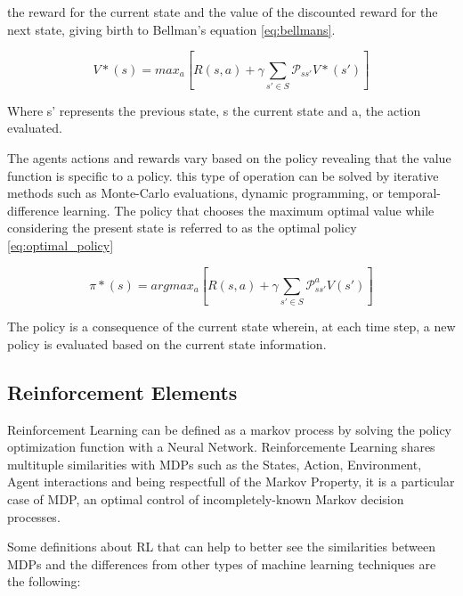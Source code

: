 the reward for the current state and the value of the discounted reward for the next state, giving birth to Bellman's equation \ref{eq:bellmans}.

\begin{equation}
    \label{eq:bellmans}
    V*(s) = max_a[ R(s,a) + \gamma \sum_{s' \in S}\mathcal{P}_{ss'} V*(s')]
\end{equation}

Where s' represents the previous state, s the current state and a, the action evaluated.

The agents actions and rewards vary based on the policy revealing that the value function is specific to a policy. this type of operation can be solved by iterative methods such as Monte-Carlo evaluations, dynamic programming, or temporal-difference learning. The policy that chooses the maximum optimal value while considering the present state is referred to as the optimal policy \ref{eq:optimal_policy}

\begin{equation}
    \label{eq:optimal_policy}
    \pi*(s) = argmax_a[R(s,a) + \gamma \sum_{s' \in S}\mathcal{P}_{ss'}^a V(s')]
\end{equation}

The policy is a consequence of the current state wherein, at each time step, a new policy is evaluated based on the current state information.

\subsection*{Reinforcement Elements}

Reinforcement Learning can be defined as a markov process by solving the policy optimization function with a Neural Network. Reinforcemente Learning shares multituple similarities with MDPs such as the States, Action, Environment, Agent interactions and being respectfull of the Markov Property, it is a particular case of MDP, an optimal control of incompletely-known Markov decision processes\cite{sutton}.

Some definitions about RL that can help to better see the similarities between MDPs and the differences from other types of machine learning techniques are the following:


